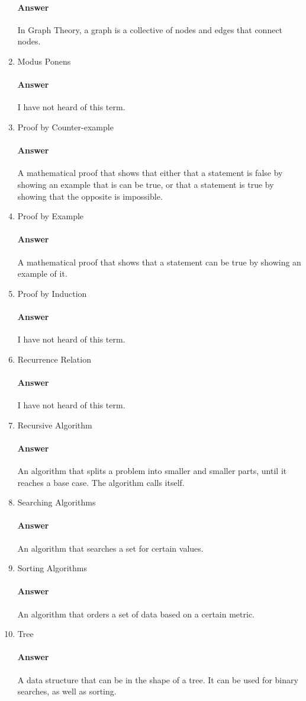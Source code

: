 \documentclass{article}
\begin{document}
\begin{enumerate}
	\paragraph{Answer} In Graph Theory, a graph is a collective of nodes and edges that connect nodes.
    \item Modus Ponens
	\paragraph{Answer}  I have not heard of this term.
    \item Proof by Counter-example
	\paragraph{Answer} A mathematical proof that shows that either that a statement is false by showing an example that is can be true, or that a statement is true by showing that the opposite is impossible.
    \item Proof by Example
	\paragraph{Answer} A mathematical proof that shows that a statement can be true by showing an example of it.
    \item Proof by Induction
	\paragraph{Answer} I have not heard of this term.
    \item Recurrence Relation
	\paragraph{Answer} I have not heard of this term.
    \item Recursive Algorithm
	\paragraph{Answer} An algorithm that splits a problem into smaller and smaller parts, until it reaches a base case. The algorithm calls itself.
    \item Searching Algorithms
	\paragraph{Answer} An algorithm that searches a set for certain values.
    \item Sorting Algorithms
	\paragraph{Answer} An algorithm that orders a set of data based on a certain metric.
    \item Tree
	\paragraph{Answer} A data structure that can be in the shape of a tree. It can be used for binary searches, as well as sorting.
\end{enumerate}
\end{document}
